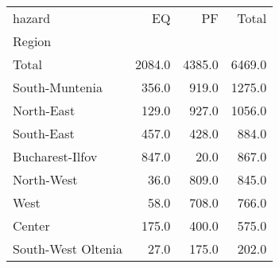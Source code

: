 \begin{tabular}{lrrr}
\toprule
hazard &      EQ &      PF &   Total \\
Region             &         &         &         \\
\midrule
Total              &  2084.0 &  4385.0 &  6469.0 \\
South-Muntenia     &   356.0 &   919.0 &  1275.0 \\
North-East         &   129.0 &   927.0 &  1056.0 \\
South-East         &   457.0 &   428.0 &   884.0 \\
Bucharest-Ilfov    &   847.0 &    20.0 &   867.0 \\
North-West         &    36.0 &   809.0 &   845.0 \\
West               &    58.0 &   708.0 &   766.0 \\
Center             &   175.0 &   400.0 &   575.0 \\
South-West Oltenia &    27.0 &   175.0 &   202.0 \\
\bottomrule
\end{tabular}
